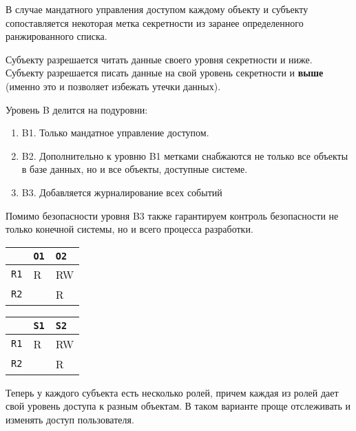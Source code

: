 \begin{definition}
  В случае мандатного управления доступом каждому объекту и субъекту
  сопоставляется некоторая метка секретности из заранее определенного
  ранжированного списка.
  
  Субъекту разрешается читать данные своего уровня секретности и ниже. Субъекту
  разрешается писать данные на свой уровень секретности и \textbf{выше} (именно
  это и позволяет избежать утечки данных).
\end{definition}

Уровень B делится на подуровни:

\begin{enumerate}
\item
  B1. Только мандатное управление доступом.

\item
  B2. Дополнительно к уровню B1 метками снабжаются не только все объекты в базе
  данных, но и все объекты, доступные системе.

\item
  B3. Добавляется журналирование всех событий
\end{enumerate}


Помимо безопасности уровня B3 также гарантируем контроль безопасности не только
конечной системы, но и всего процесса разработки.


\begin{minipage}{0.15 \textwidth}
  \centering

  \begin{tabularx}{0.9 \textwidth}{ X | X  X }
                & \texttt{O1} & \texttt{O2} \\ \hline
    \texttt{R1} & R           & RW          \\
    \texttt{R2} &             & R           \\
  \end{tabularx}
\end{minipage}%
\hspace{0.05 \textwidth}%
\begin{minipage}{0.15 \textwidth}
  \centering

  \begin{tabularx}{0.9 \textwidth}{ X | X  X }
                & \texttt{S1} & \texttt{S2} \\ \hline
    \texttt{R1} & R           & RW          \\
    \texttt{R2} &             & R           \\
  \end{tabularx}
\end{minipage}%
\hspace{0.05 \textwidth}%
\begin{minipage}{0.6 \textwidth}
  Теперь у каждого субъекта есть несколько ролей, причем каждая из ролей дает
  свой уровень доступа к разным объектам. В таком варианте проще отслеживать
  и изменять доступ пользователя.
\end{minipage}

